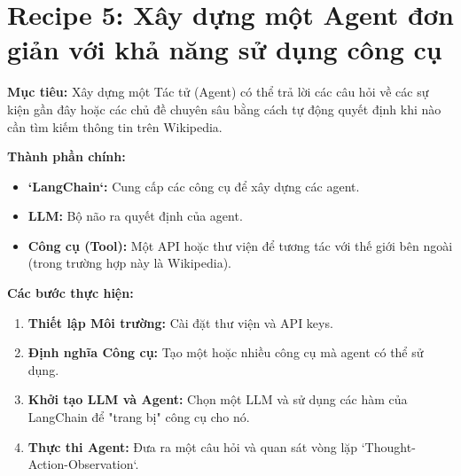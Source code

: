 
\section{Recipe 5: Xây dựng một Agent đơn giản với khả năng sử dụng công cụ}
\label{sec:recipe_agent}

\textbf{Mục tiêu:} Xây dựng một Tác tử (Agent) có thể trả lời các câu hỏi về các sự kiện gần đây hoặc các chủ đề chuyên sâu bằng cách tự động quyết định khi nào cần tìm kiếm thông tin trên Wikipedia.

\textbf{Thành phần chính:}
\begin{itemize}
    \item \textbf{`LangChain`:} Cung cấp các công cụ để xây dựng các agent.
    \item \textbf{LLM:} Bộ não ra quyết định của agent.
    \item \textbf{Công cụ (Tool):} Một API hoặc thư viện để tương tác với thế giới bên ngoài (trong trường hợp này là Wikipedia).
\end{itemize}

\textbf{Các bước thực hiện:}
\begin{enumerate}
    \item \textbf{Thiết lập Môi trường:} Cài đặt thư viện và API keys.
    \item \textbf{Định nghĩa Công cụ:} Tạo một hoặc nhiều công cụ mà agent có thể sử dụng.
    \item \textbf{Khởi tạo LLM và Agent:} Chọn một LLM và sử dụng các hàm của LangChain để "trang bị" công cụ cho nó.
    \item \textbf{Thực thi Agent:} Đưa ra một câu hỏi và quan sát vòng lặp `Thought-Action-Observation`.
\end{enumerate}

